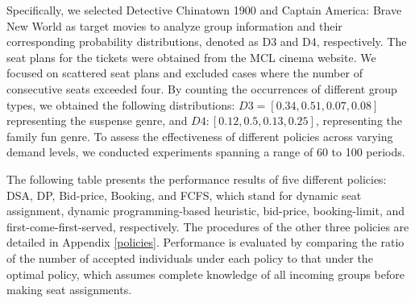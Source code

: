 Specifically, we selected Detective Chinatown 1900 and Captain America: Brave New World as target movies to analyze group information and their corresponding probability distributions, denoted as D3 and D4, respectively. The seat plans for the tickets were obtained from the MCL cinema website. We focused on scattered seat plans and excluded cases where the number of consecutive seats exceeded four. By counting the occurrences of different group types, we obtained the following distributions: $D3 = [0.34, 0.51, 0.07, 0.08]$ representing the suspense genre, and $D4: [0.12, 0.5, 0.13, 0.25]$, representing the family fun genre. To assess the effectiveness of different policies across varying demand levels, we conducted experiments spanning a range of 60 to 100 periods. 


The following table presents the performance results of five different policies: DSA, DP, Bid-price, Booking, and FCFS, which stand for dynamic seat assignment, dynamic programming-based heuristic, bid-price, booking-limit, and first-come-first-served, respectively. The procedures of the other three policies are detailed in Appendix \ref{policies}. Performance is evaluated by comparing the ratio of the number of accepted individuals under each policy to that under the optimal policy, which assumes complete knowledge of all incoming groups before making seat assignments.

